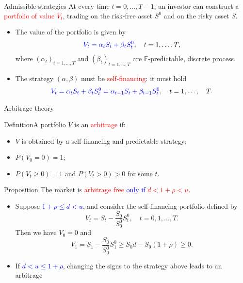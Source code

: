 \documentclass[9 pt]{beamer} %
\def \blue {\textcolor{blue}}
\def \red {\textcolor{red}}
\def \bF {\mathbb{F}}
\begin{document}
\begin{frame}{Admissible strategies}
At every time $t=0,\dots,T-1$, an investor can construct a \red{portfolio of value $V_t$}, trading on the risk-free asset $S^0$ and on the risky asset $S$.
\begin{itemize}
\item The value of the portfolio is given by
$$
\blue{V_t = \alpha_t S_t + \beta_t S_t^0}, \quad t=1,\dots, T,
$$
where $(\alpha_t)_{t=1,\dots,T}$ and $(\beta_t)_{t=1,\dots,T}$ are $\bF$-predictable, discrete process.

\item The strategy $(\alpha, \beta)$ must be \red{self-financing}: it must hold
$$
\blue{V_t =   \alpha_{t} S_t + \beta_{t} S_t^0 =  \alpha_{t-1} S_t + \beta_{t-1} S_t^0}, \quad t=1,\dots,\quad T.
$$
\end{itemize}
\end{frame}

\begin{frame}{Arbitrage theory}
\begin{block}{Definition}A portfolio $V$ is an \red{arbitrage} if:
\begin{itemize}
\item $V$ is obtained by a self-financing and predictable strategy;
\item $P(V_0=0)=1$;
\item $P(V_t \ge 0)=1$ and  $P(V_t > 0)>0$ for some $t$.
\end{itemize}
\end{block}

\begin{block}{Proposition}
The market is \red{arbitrage free} \blue{only if}  \red{$d < 1 + \rho <u$}.
\end{block}
\begin{itemize}
\item Suppose \blue{$1 + \rho \le d < u$}, and consider the self-financing portfolio defined by
$$
V_t = S_t - \frac{S_0}{S_0^0} S^0_t,  \quad t=0,1,\dots, T.
$$ 
Then we have $V_0=0$ and 
$$
V_1=S_1- \frac{S_0}{S_0^0}S_1^0\ge S_0d-S_0(1+\rho) \ge 0.
$$
\item If \blue{$d<u\le 1+\rho$}, changing the signs to the strategy above leads to an arbitrage
\end{itemize}
\end{frame}
\end{document}
